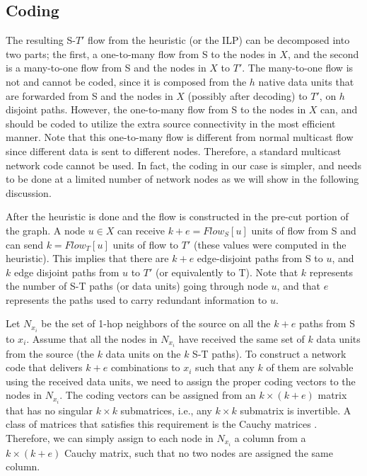 \documentclass[conference]{IEEEtran}
\begin{document}
\subsection{Coding}

The resulting S-$T'$ flow from the heuristic (or the ILP) can be decomposed into two parts; the first, a one-to-many flow from S to the nodes in $X$, and the second is a many-to-one flow from S and the nodes in $X$ to $T'$. The many-to-one flow is not and cannot be coded, since it is composed from the $h$ native data units that are forwarded from S and the nodes in $X$ (possibly after decoding) to $T'$, on $h$ disjoint paths. However, the one-to-many flow from S to the nodes in $X$ can, and should be coded to utilize the extra source connectivity in the most efficient manner. Note that this one-to-many flow is different from normal multicast flow since different data is sent to different nodes. Therefore, a standard multicast network code cannot be used. In fact, the coding in our case is simpler, and needs to be done at a limited number of network nodes as we will show in the following discussion. 

After the heuristic is done and the flow is constructed in the pre-cut portion of the graph. A node $u \in X$ can receive $k+e = Flow_S[u]$ units of flow from S and can send $k = Flow_T[u]$ units of flow to $T'$ (these values were computed in the heuristic). This implies that there are $k+e$ edge-disjoint paths from S to $u$, and $k$ edge disjoint paths from $u$ to $T'$ (or equivalently to T). Note that $k$ represents the number of S-T paths (or data units) going through node $u$, and that $e$ represents the paths used to carry redundant information to $u$.



Let $N_{x_i}$ be the set of 1-hop neighbors of the source on all the $k+e$ paths from S to $x_i$. Assume that all the nodes in $N_{x_i}$ have received the same set of $k$ data units from the source (the $k$ data units on the $k$ S-T paths). To construct a network code that delivers $k+e$ combinations to $x_i$ such that any $k$ of them are solvable using the received data units, we need to assign the proper coding vectors to the nodes in $N_{x_i}$. The coding vectors can be assigned from an $k \times (k+e)$ matrix that has no singular $k \times k$ submatrices, i.e., any $k \times k$ submatrix is invertible. A class of matrices that satisfies this requirement is the Cauchy matrices \cite{FN77}. Therefore, we can simply assign to each node in $N_{x_i}$ a column from a $k \times (k+e)$ Cauchy matrix, such that no two nodes are assigned the same column. 
\end{document}
